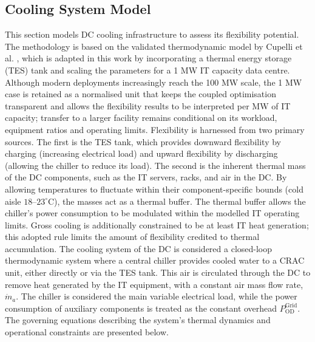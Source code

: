 \documentclass[lettersize,journal]{IEEEtran}
\begin{document}
\subsection{Cooling System Model} \label{sec: Cooling Infrastructure Flexibility} 
This section models DC cooling infrastructure to assess its flexibility potential. The methodology is based on the validated thermodynamic model by Cupelli et al. \cite{cupelli2018data}, which is adapted in this work by incorporating a thermal energy storage (TES) tank and scaling the parameters for a 1 MW IT capacity data centre. Although modern deployments increasingly reach the 100 MW scale, the 1 MW case is retained as a normalised unit that keeps the coupled optimisation transparent and allows the flexibility results to be interpreted per MW of IT capacity; transfer to a larger facility remains conditional on its workload, equipment ratios and operating limits.
Flexibility is harnessed from two primary sources. The first is the TES tank, which provides downward flexibility by charging (increasing electrical load) and upward flexibility by discharging (allowing the chiller to reduce its load). The second is the inherent thermal mass of the DC components, such as the IT servers, racks, and air in the DC. By allowing temperatures to fluctuate within their component-specific bounds (cold aisle $18$--$23^\circ$C), the masses act as a thermal buffer. The thermal buffer allows the chiller's power consumption to be modulated within the modelled IT operating limits. Gross cooling is additionally constrained to be at least IT heat generation; this adopted rule limits the amount of flexibility credited to thermal accumulation.
The cooling system of the DC is considered a closed-loop thermodynamic system where a central chiller provides cooled water to a CRAC unit, either directly or via the TES tank. This air is circulated through the DC to remove heat generated by the IT equipment, with a constant air mass flow rate, $\dot{m}_{a}$. The chiller is considered the main variable electrical load, while the power consumption of auxiliary components is treated as the constant overhead $P^{\mathrm{Grid}}_{\mathrm{OD}}$. The governing equations describing the system's thermal dynamics and operational constraints are presented below.
\end{document}
